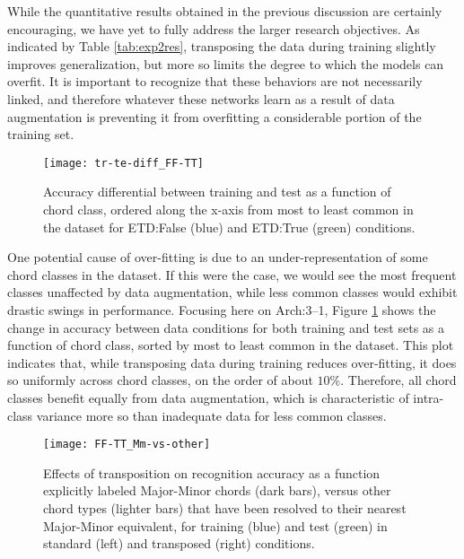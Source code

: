 While the quantitative results obtained in the previous discussion are certainly encouraging, we have yet to fully address the larger research objectives.
As indicated by Table \ref{tab:exp2res}, transposing the data during training slightly improves generalization, but more so limits the degree to which the models can overfit.
It is important to recognize that these behaviors are not necessarily linked, and therefore whatever these networks learn as a result of data augmentation is preventing it from overfitting a considerable portion of the training set.


\begin{figure}[!t]
\centering
 \centerline{\texttt{[image: tr-te-diff\_FF-TT]}}
\caption{Accuracy differential between training and test as a function of chord class, ordered along the x-axis from most to least common in the dataset for ETD:False (blue) and ETD:True (green) conditions.}
\label{fig:classes}
\end{figure}

One potential cause of over-fitting is due to an under-representation of some chord classes in the dataset.
If this were the case, we would see the most frequent classes unaffected by data augmentation, while less common classes would exhibit drastic swings in performance.
Focusing here on Arch:3--1, Figure \ref{fig:classes} shows the change in accuracy between data conditions for both training and test sets as a function of chord class, sorted by most to least common in the dataset.
This plot indicates that, while transposing data during training reduces over-fitting, it does so uniformly across chord classes, on the order of about $10\%$.
Therefore, all chord classes benefit equally from data augmentation, which is characteristic of intra-class variance more so than inadequate data for less common classes.

\begin{figure}[!t]
\centering
\texttt{[image: FF-TT\_Mm-vs-other]}
\caption{Effects of transposition on recognition accuracy as a function explicitly labeled Major-Minor chords (dark bars), versus other chord types (lighter bars) that have been resolved to their nearest Major-Minor equivalent, for training (blue) and test (green) in standard (left) and transposed (right) conditions.}
\label{fig:strict_vs_others}
\end{figure}

